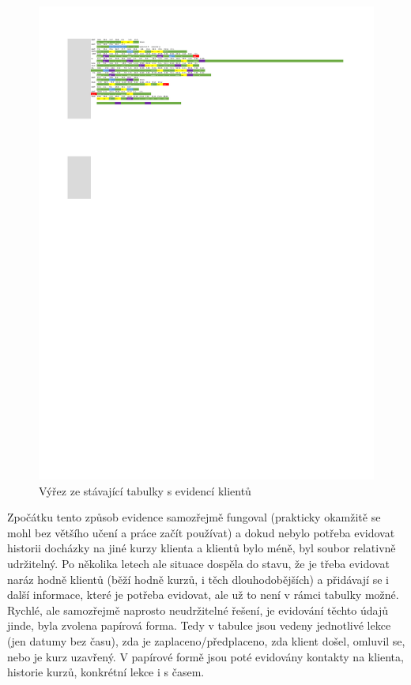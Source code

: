     \begin{figure}\centering
    	\includegraphics[width=1\textwidth]{img/excel3}
    	\caption{Výřez ze stávající tabulky s evidencí klientů}\label{fig:excel}
    \end{figure}
    
    Zpočátku tento způsob evidence samozřejmě fungoval (prakticky okamžitě se mohl bez většího učení a práce začít používat) a dokud nebylo potřeba evidovat historii docházky na jiné kurzy klienta a klientů bylo méně, byl soubor relativně udržitelný. Po několika letech ale situace dospěla do stavu, že je třeba evidovat naráz hodně klientů (běží hodně kurzů, i těch dlouhodobějších) a přidávají se i další informace, které je potřeba evidovat, ale už to není v rámci tabulky možné. Rychlé, ale samozřejmě naprosto neudržitelné řešení, je evidování těchto údajů jinde, byla zvolena papírová forma. Tedy v tabulce jsou vedeny jednotlivé lekce (jen datumy bez času), zda je zaplaceno/předplaceno, zda klient došel, omluvil se, nebo je kurz uzavřený. V papírové formě jsou poté evidovány kontakty na klienta, historie kurzů, konkrétní lekce i s časem.
    
